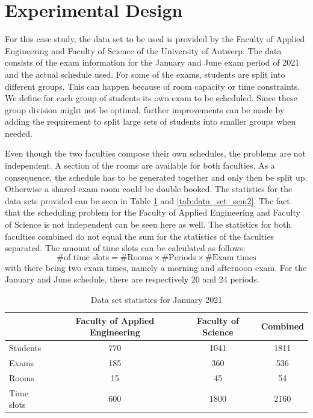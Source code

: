 \section{Experimental Design}\label{sec:experiment}

For this case study, the data set to be used is provided by the Faculty of Applied Engineering and Faculty of Science of the University of Antwerp. The data consists of the exam information for the January and June exam period of 2021 and the actual schedule used. For some of the exams, students are split into different groups. This can happen because of room capacity or time constraints. We define for each group of students its own exam to be scheduled. Since these group division might not be optimal, further improvements can be made by adding the requirement to split large sets of students into smaller groups when needed.

Even though the two faculties compose their own schedules, the problems are not independent. A section of the rooms are available for both faculties. As a consequence, the schedule has to be generated together and only then be split up. Otherwise a shared exam room could be double booked. The statistics for the data sets provided can be seen in Table \ref{tab:data_set_sem1} and \ref{tab:data_set_sem2}. The fact that the scheduling problem for the Faculty of Applied Engineering and Faculty of Science is not independent can be seen here as well. The statistics for both faculties combined do not equal the sum for the statistics of the faculties separated. The amount of time slots can be calculated as follows:
\begin{equation}
    \text{\# of time slots} = \text{\# Rooms} \times \text{\# Periods} \times \text{\# Exam times}  
\end{equation}
with there being two exam times, namely a morning and afternoon exam. For the January and June schedule, there are respectively 20 and 24 periods.
\begin{table}[H]
	\caption{Data set statistics for January 2021}
	\label{tab:data_set_sem1}
	\centering
	\begin{tabular}{l c c c }
		\hline
		& \textbf{Faculty of Applied Engineering} & \textbf{Faculty of Science} & \textbf{Combined} \\ \hline
		Students & 770 & 1041 & 1811 \\
		Exams & 185 & 360 & 536 \\
	    Rooms & 15 & 45 & 54 \\
        Time slots & 600 & 1800 & 2160 \\ \hline
	\end{tabular}
\end{table}

